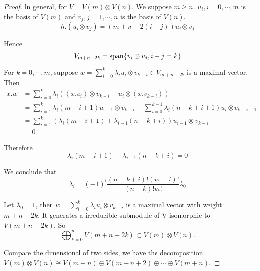 \begin{proof}
  In general, for $V = V(m)\otimes V(n)$. We suppose $m \geqslant n$. $u_i, i = 0, \cdots ,m$ is the basis of $V(m)$ and $v_j , j = 1, \cdots, n$ is the basis of $V(n)$.
  \begin{equation*}
    h.(u_i\otimes v_j) = (m + n - 2(i + j))u_i\otimes v_j
  \end{equation*}

  Hence
  \begin{equation*}
    V_{m+n-2k} = \operatorname{span}\{u_i\otimes v_j, i+j=k\}
  \end{equation*}

  For $k = 0,\cdots,m$, suppose $w = \sum\limits_{i=0}^k \lambda_iu_i\otimes v_{k-i} \in V_{m+n-2k}$ is a maximal vector. Then
  \begin{align*}
    x.w &= \sum_{i=0}^k \lambda_i((x.u_i)\otimes v_{k-i} + u_i\otimes (x.v_{k-i})) \\
           &= \sum_{i=1}^k \lambda_i(m - i + 1)u_{i-1}\otimes v_{k-i} + \sum_{i=0}^{k-1} \lambda_i(n - k + i + 1)u_i\otimes v_{k-i-1} \\
           &= \sum_{i=1}^k (\lambda_i(m - i + 1) + \lambda_{i-1}(n - k + i))u_{i-1}\otimes v_{k-i} \\
           &= 0
  \end{align*}

  Therefore
  \begin{equation*}
    \lambda_i(m - i + 1) + \lambda_{i-1}(n - k + i) = 0
  \end{equation*}

  We conclude that
  \begin{equation*}
    \lambda_i = (-1)^i \frac{(n-k+i)!(m-i)!}{(n-k)!m!} \lambda_0
  \end{equation*}

  Let $\lambda_0 = 1$, then $w = \sum\limits_{i=0}^k \lambda_iu_i\otimes v_{k-i}$ is a maximal vector with weight $m+n-2k$. It generates a irreducible submodule of V isomorphic to $V(m + n - 2k)$. So
  \begin{equation*}
    \bigoplus_{k=0}^n V(m + n - 2k) \subset V(m)\otimes V(n).
  \end{equation*}

  Compare the dimensional of two sides, we have the decomposition $V(m)\otimes V(n) \cong V(m-n)\oplus V(m-n+2)\oplus\cdots\oplus V(m+n)$.
\end{proof}
